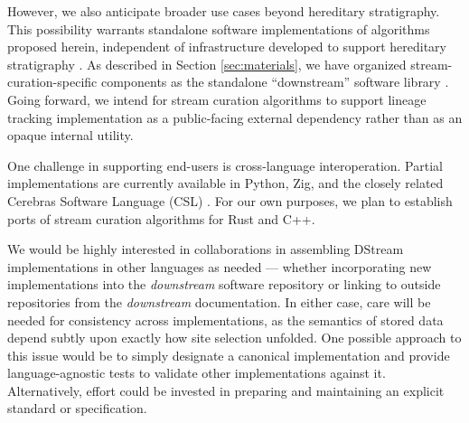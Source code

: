 However, we also anticipate broader use cases beyond hereditary stratigraphy.
This possibility warrants standalone software implementations of algorithms proposed herein, independent of infrastructure developed to support hereditary stratigraphy \citep{moreno2022hstrat}.
As described in Section \ref{sec:materials}, we have organized stream-curation-specific components as the standalone ``downstream'' software library \citep{moreno2024downstream}.
Going forward, we intend for stream curation algorithms to support lineage tracking implementation as a public-facing external dependency rather than as an opaque internal utility.

One challenge in supporting end-users is cross-language interoperation.
Partial implementations are currently available in Python, Zig, and the closely related Cerebras Software Language (CSL) \citep{moreno2024hsurf,moreno2024downstream,moreno2024wse}.
For our own purposes, we plan to establish ports of stream curation algorithms for Rust and C++.

We would be highly interested in collaborations in assembling DStream implementations in other languages as needed --- whether incorporating new implementations into the \textit{downstream} software repository or linking to outside repositories from the \textit{downstream} documentation.
In either case, care will be needed for consistency across implementations, as the semantics of stored data depend subtly upon exactly how site selection unfolded.
One possible approach to this issue would be to simply designate a canonical implementation and provide language-agnostic tests to validate other implementations against it.
Alternatively, effort could be invested in preparing and maintaining an explicit standard or specification.
